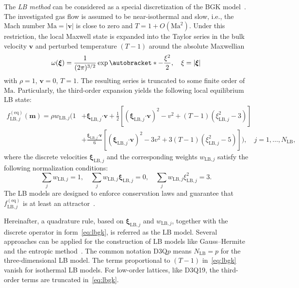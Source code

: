 \documentclass{elsarticle} %
\newcommand{\Ma}{\mathrm{Ma}}
\newcommand{\OO}[1]{O(#1)}
\DeclarePairedDelimiter\autobracket()       %
\newcommand{\br}[1]{\autobracket*{#1}}
\newcommand{\bxi}{\boldsymbol{\xi}}
\newcommand{\bv}{\boldsymbol{v}}
\newcommand{\bm}{\boldsymbol{m}}
\newcommand{\bdot}{\boldsymbol{\cdot}}
\newcommand{\equil}[1]{#1^\mathrm{(eq)}}
\newcommand{\LB}{\mathrm{LB}}
\begin{document}
The \emph{LB method} can be considered as a special discretization of the BGK model~\cite{Succi2001}.
The investigated gas flow is assumed to be near-isothermal and slow,
i.e., the Mach number \(\Ma = |\bv|\) is close to zero and \(T = 1 + \OO{\Ma^2}\).
Under this restriction, the local Maxwell state is expanded into the Taylor series
in the bulk velocity \(\bv\) and perturbed temperature \((T-1)\)
around the absolute Maxwellian
\begin{equation}\label{eq:omega}
    \omega(\bxi) = \frac{1}{(2\pi)^{3/2}}\exp\br{ -\frac{\xi^2}{2} }, \quad \xi = |\bxi|
\end{equation}
with \(\rho=1\), \(\bv=0\), \(T=1\).
The resulting series is truncated to some finite order of \(\Ma\).
Particularly, the third-order expansion yields the following local equilibrium LB state:
\begin{equation}\label{eq:lbgk}
    \begin{aligned}
    \equil{f}_{\LB,j}(\bm) = \rho w_{\LB,j}\bigg( 1
        &+ \bxi_{\LB,j}\bdot\bv
        + \frac12\left[ (\bxi_{\LB,j}\bdot\bv)^2 - v^2 + (T-1)(\xi_{\LB,j}^2 - 3) \right] \\
        &+ \frac{\bxi_{\LB,j}\bdot\bv}6\left[ (\bxi_{\LB,j}\bdot\bv)^2 - 3v^2 + 3(T-1)(\xi_{\LB,j}^2-5) \right]
    \bigg), \quad j = 1,\ldots,N_\LB,
    \end{aligned}
\end{equation}
where the discrete velocities \(\bxi_{\LB,j}\) and the corresponding weights \(w_{\LB,j}\)
satisfy the following normalization conditions:
\begin{equation}
    \sum_j w_{\LB,j} = 1, \quad \sum_j w_{\LB,j} \bxi_{\LB,j} = 0, \quad \sum_j w_{\LB,j} \xi_{\LB,j}^2 = 3.
\end{equation}
The LB models are designed to enforce conservation laws
and guarantee that \(\equil{f}_{\LB,j}\) is at least an attractor~\cite{Luo2000}.

Hereinafter, a quadrature rule, based on \(\bxi_{\LB,j}\) and \(w_{\LB,j}\),
together with the discrete operator in form~\eqref{eq:lbgk},
is referred as the LB model.
Several approaches can be applied for the construction of LB models
like Gauss--Hermite~\cite{He1997, Shan1998, Shan2006, Shan2010}
and the entropic method~\cite{Karlin1999, Chikatamarla2006, Chikatamarla2009}.
The common notation D3Q\(p\) means \(N_\LB=p\) for the three-dimensional LB model.
The terms proportional to \((T-1)\) in~\eqref{eq:lbgk} vanish for isothermal LB models.
For low-order lattices, like D3Q19, the third-order terms are truncated in~\eqref{eq:lbgk}.
\end{document}
